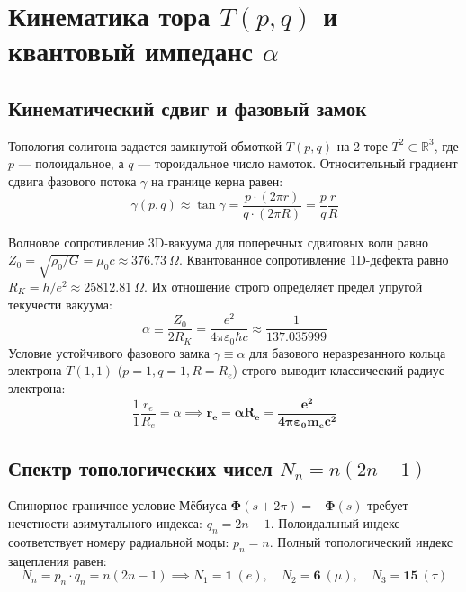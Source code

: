 \documentclass[12pt,a4paper]{article}
\begin{document}
	\section{Кинематика тора $T(p,q)$ и квантовый импеданс $\alpha$}
	
	\subsection{Кинематический сдвиг и фазовый замок}
	Топология солитона задается замкнутой обмоткой $T(p,q)$ на 2-торе $T^2 \subset \mathbb{R}^3$, где $p$ — полоидальное, а $q$ — тороидальное число намоток. Относительный градиент сдвига фазового потока $\gamma$ на границе керна равен:
	\begin{equation}
		\gamma(p,q) \approx \tan\gamma = \frac{p \cdot (2\pi r)}{q \cdot (2\pi R)} = \frac{p}{q} \frac{r}{R}
	\end{equation}
	
	Волновое сопротивление 3D-вакуума для поперечных сдвиговых волн равно $Z_0 = \sqrt{\rho_0/G} = \mu_0 c \approx 376.73 \ \Omega$. Квантованное сопротивление 1D-дефекта равно $R_K = h/e^2 \approx 25812.81 \ \Omega$. Их отношение строго определяет предел упругой текучести вакуума:
	\begin{equation}
		\alpha \equiv \frac{Z_0}{2 R_K} = \frac{e^2}{4\pi \varepsilon_0 \hbar c} \approx \frac{1}{137.035999}
	\end{equation}
	Условие устойчивого фазового замка $\gamma \equiv \alpha$ для базового неразрезанного кольца электрона $T(1,1)$ ($p=1, q=1, R=R_e$) строго выводит классический радиус электрона:
	\begin{equation}
		\frac{1}{1} \frac{r_e}{R_e} = \alpha \implies \mathbf{r_e = \alpha R_e = \frac{e^2}{4\pi\varepsilon_0 m_e c^2}}
	\end{equation}
	
	\subsection{Спектр топологических чисел $N_n = n(2n-1)$}
	Спинорное граничное условие Мёбиуса $\boldsymbol{\Phi}(s+2\pi) = -\boldsymbol{\Phi}(s)$ требует нечетности азимутального индекса: $q_n = 2n - 1$. Полоидальный индекс соответствует номеру радиальной моды: $p_n = n$. Полный топологический индекс зацепления равен:
	\begin{equation}
		N_n = p_n \cdot q_n = n(2n - 1) \implies N_1 = \mathbf{1} \ (e), \quad N_2 = \mathbf{6} \ (\mu), \quad N_3 = \mathbf{15} \ (\tau)
	\end{equation}
	
\end{document}
